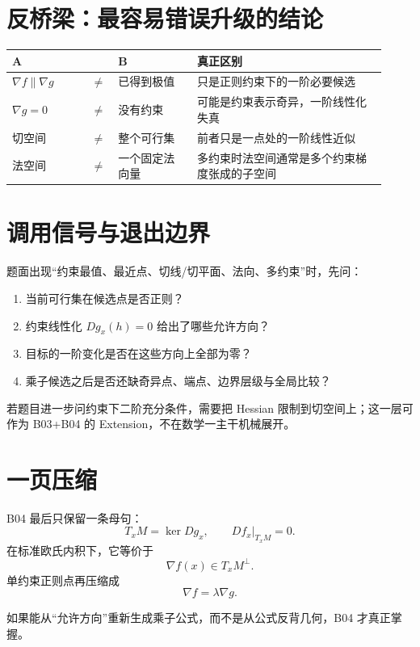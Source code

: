 \documentclass[profile=standard]{ipara-handbook}
\begin{document}
\section{反桥梁：最容易错误升级的结论}
\begin{tabular}{p{0.20\linewidth}p{0.04\linewidth}p{0.20\linewidth}p{0.48\linewidth}}
\hline
A & & B & 真正区别\\
\hline
$\nabla f\parallel\nabla g$ & $\neq$ & 已得到极值 & 只是正则约束下的一阶必要候选\\
$\nabla g=0$ & $\neq$ & 没有约束 & 可能是约束表示奇异，一阶线性化失真\\
切空间 & $\neq$ & 整个可行集 & 前者只是一点处的一阶线性近似\\
法空间 & $\neq$ & 一个固定法向量 & 多约束时法空间通常是多个约束梯度张成的子空间\\
\hline
\end{tabular}

\section{调用信号与退出边界}
题面出现“约束最值、最近点、切线/切平面、法向、多约束”时，先问：
\begin{enumerate}
\item 当前可行集在候选点是否正则？
\item 约束线性化 $Dg_x(h)=0$ 给出了哪些允许方向？
\item 目标的一阶变化是否在这些方向上全部为零？
\item 乘子候选之后是否还缺奇异点、端点、边界层级与全局比较？
\end{enumerate}

若题目进一步问约束下二阶充分条件，需要把 Hessian 限制到切空间上；这一层可作为 B03+B04 的 Extension，不在数学一主干机械展开。

\section{一页压缩}
B04 最后只保留一条母句：
\[
\boxed{
T_xM=\ker Dg_x,
\qquad
Df_x|_{T_xM}=0.
}
\]
在标准欧氏内积下，它等价于
\[
\boxed{\nabla f(x)\in T_xM^\perp.}
\]
单约束正则点再压缩成
\[
\nabla f=\lambda\nabla g.
\]

如果能从“允许方向”重新生成乘子公式，而不是从公式反背几何，B04 才真正掌握。
\end{document}
